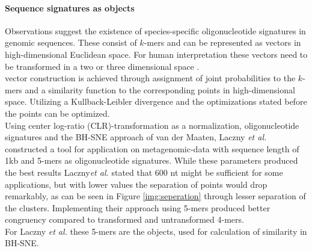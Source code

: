 \documentclass[twocolumn]{bmcart}%
\begin{document}
\paragraph*{Sequence signatures as objects}
Observations suggest the existence of species-specific oligonucleotide signatures in genomic sequences\cite{Laczny2014,Cheng1194}. These consist of $k$-mers and can be represented as vectors in high-dimensional Euclidean space. For human interpretation these vectors need to be transformed in a two or three dimensional space \cite{Laczny2014}.\\
vector construction is achieved through assignment of joint probabilities to the $k$-mers and a similarity function to the corresponding points in high-dimensional space. Utilizing a Kullback-Leibler divergence and the optimizations stated before the points can be optimized.\\
Using center log-ratio (CLR)-transformation as a normalization, oligonucleotide signatures and the BH-SNE approach of van der Maaten, Laczny \textit{et al.} constructed a tool for application on metagenomic-data with sequence length of 1kb and 5-mers as oligonucleotide signatures. While these parameters produced the best results Laczny\textit{et al.} stated that 600 nt might be sufficient for some applications, but with lower values the separation of points would drop remarkably, as can be seen in Figure  \ref{img:seperation} through lesser separation of the clusters. Implementing their approach using 5-mers produced better congruency compared to transformed and untransformed 4-mers.\\
For Laczny \textit{et al.} these 5-mers are the objects, used for calculation of similarity in BH-SNE.
\end{document}
